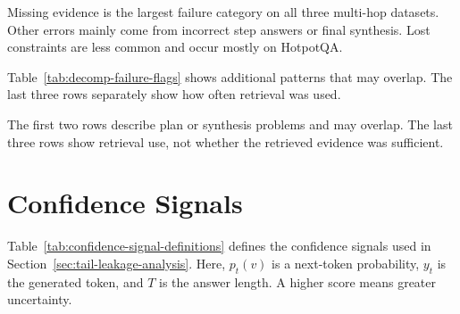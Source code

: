 \documentclass{nthu_thesis}
\begin{document}
\begin{thesiscjk}
Missing evidence is the largest failure category on all three multi-hop datasets. Other errors mainly come from incorrect step answers or final synthesis. Lost constraints are less common and occur mostly on HotpotQA.

Table~\ref{tab:decomp-failure-flags} shows additional patterns that may overlap. The last three rows separately show how often retrieval was used.

\begin{table}[h]
    \centering
    \caption[Additional Decomposition Patterns]{Additional patterns in decomposition errors.}
    \label{tab:decomp-failure-flags}
    \setlength{\tabcolsep}{6pt}
    \scriptsize
\end{table}

The first two rows describe plan or synthesis problems and may overlap. The last three rows show retrieval use, not whether the retrieved evidence was sufficient.

\clearpage
\section{Confidence Signals}
\label{app:confidence-signals}

Table~\ref{tab:confidence-signal-definitions} defines the confidence signals used in Section~\ref{sec:tail-leakage-analysis}. Here, $p_t(v)$ is a next-token probability, $y_t$ is the generated token, and $T$ is the answer length. A higher score means greater uncertainty.


\end{thesiscjk}
\end{document}
